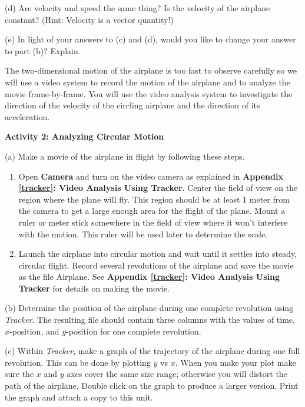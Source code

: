 (d) Are velocity and speed the same thing? Is the velocity of the airplane constant?
(Hint: Velocity is a vector quantity!)
\answerspace{15mm}

\pagebreak

(e) In light of your answers to (c) and (d), would you like to change your answer
to part (b)? Explain.
\answerspace{20mm}

The two-dimensional motion of the airplane is too fast to observe carefully
so we will use a video system to record the motion of the airplane and to analyze
the movie frame-by-frame. You will use the video analysis system to investigate
the direction of the velocity of the circling airplane and the direction of
its acceleration.

\textbf{Activity 2: Analyzing Circular Motion }

(a) Make a movie of the airplane in flight by following these steps. 

\begin{enumerate}
\item Open \textbf{Camera} and turn on the video camera as explained in 
\textbf{Appendix \ref{tracker}: Video Analysis Using Tracker}. Center the field of view on the region where the
plane will fly. This region should be at least 1 meter from the camera to get a
large enough area for the flight of the plane. Mount a ruler or meter stick
somewhere in the field of view where it won't interfere with the motion. This
ruler will be used later to determine the scale. 
\item Launch the airplane into circular motion and wait until it settles into steady,
circular flight. Record several revolutions of the airplane and save the movie as the file Airplane. See \textbf{Appendix \ref{tracker}: Video Analysis Using Tracker} for details on making the movie.
\end{enumerate}
(b) Determine the position of the airplane during one complete revolution using \textit{Tracker}.  The resulting file should contain three columns with the values of time, $x$-position, and $y$-position for one complete revolution. 

(c) Within \textit{Tracker}, make a graph of the trajectory of the airplane during one full revolution.
This can be done by plotting $y$ vs $x$. When you make your plot make sure the $x$ and $y$ 
axes cover the same size range; otherwise you will distort the path of the airplane. Double click 
on the graph to produce a larger version. Print the graph and attach a copy to this unit.

